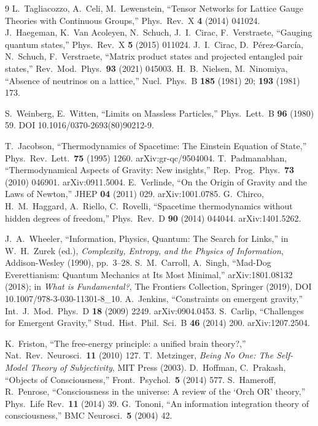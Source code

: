 \begin{thebibliography}{9}
L.~Tagliacozzo, A.~Celi, M.~Lewenstein, ``Tensor Networks for Lattice Gauge Theories with Continuous Groups,'' Phys.\ Rev.\ X \textbf{4} (2014) 041024.
J.~Haegeman, K.~Van Acoleyen, N.~Schuch, J.~I.~Cirac, F.~Verstraete, ``Gauging quantum states,'' Phys.\ Rev.\ X \textbf{5} (2015) 011024.
J.~I.~Cirac, D.~P\'erez-Garc\'ia, N.~Schuch, F.~Verstraete, ``Matrix product states and projected entangled pair states,'' Rev.\ Mod.\ Phys.\ \textbf{93} (2021) 045003.
H.~B.~Nielsen, M.~Ninomiya, ``Absence of neutrinos on a lattice,'' Nucl.\ Phys.\ B \textbf{185} (1981) 20; \textbf{193} (1981) 173.

S.~Weinberg, E.~Witten, ``Limits on Massless Particles,'' Phys.\ Lett.\ B \textbf{96} (1980) 59. DOI 10.1016/0370-2693(80)90212-9.

T.~Jacobson, ``Thermodynamics of Spacetime: The Einstein Equation of State,'' Phys.\ Rev.\ Lett.\ \textbf{75} (1995) 1260. arXiv:gr-qc/9504004.
T.~Padmanabhan, ``Thermodynamical Aspects of Gravity: New insights,'' Rep.\ Prog.\ Phys.\ \textbf{73} (2010) 046901. arXiv:0911.5004.
E.~Verlinde, ``On the Origin of Gravity and the Laws of Newton,'' JHEP \textbf{04} (2011) 029. arXiv:1001.0785.
G.~Chirco, H.~M.~Haggard, A.~Riello, C.~Rovelli, ``Spacetime thermodynamics without hidden degrees of freedom,'' Phys.\ Rev.\ D \textbf{90} (2014) 044044. arXiv:1401.5262.

J.~A.~Wheeler, ``Information, Physics, Quantum: The Search for Links,'' in W.~H.~Zurek (ed.), \emph{Complexity, Entropy, and the Physics of Information}, Addison-Wesley (1990), pp.~3--28.
S.~M.~Carroll, A.~Singh, ``Mad-Dog Everettianism: Quantum Mechanics at Its Most Minimal,'' arXiv:1801.08132 (2018); in \emph{What is Fundamental?}, The Frontiers Collection, Springer (2019), DOI 10.1007/978-3-030-11301-8\_10.
A.~Jenkins, ``Constraints on emergent gravity,'' Int.\ J.\ Mod.\ Phys.\ D \textbf{18} (2009) 2249. arXiv:0904.0453.
S.~Carlip, ``Challenges for Emergent Gravity,'' Stud.\ Hist.\ Phil.\ Sci.\ B \textbf{46} (2014) 200. arXiv:1207.2504.

K.~Friston, ``The free-energy principle: a unified brain theory?,'' Nat.\ Rev.\ Neurosci.\ \textbf{11} (2010) 127.
T.~Metzinger, \textit{Being No One: The Self-Model Theory of Subjectivity}, MIT Press (2003).
D.~Hoffman, C.~Prakash, ``Objects of Consciousness,'' Front.\ Psychol.\ \textbf{5} (2014) 577.
S.~Hameroff, R.~Penrose, ``Consciousness in the universe: A review of the `Orch OR' theory,'' Phys.\ Life Rev.\ \textbf{11} (2014) 39.
G.~Tononi, ``An information integration theory of consciousness,'' BMC Neurosci.\ \textbf{5} (2004) 42.


\end{thebibliography}
